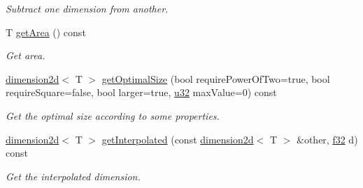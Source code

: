 \begin{DoxyCompactItemize}
\begin{DoxyCompactList}\small\item\em Subtract one dimension from another. \end{DoxyCompactList}\item 
T \hyperlink{classirr_1_1core_1_1dimension2d_a1454be218dbb43736488ff9f4236f0da}{get\+Area} () const \hypertarget{classirr_1_1core_1_1dimension2d_a1454be218dbb43736488ff9f4236f0da}{}\label{classirr_1_1core_1_1dimension2d_a1454be218dbb43736488ff9f4236f0da}

\begin{DoxyCompactList}\small\item\em Get area. \end{DoxyCompactList}\item 
\hyperlink{classirr_1_1core_1_1dimension2d}{dimension2d}$<$ T $>$ \hyperlink{classirr_1_1core_1_1dimension2d_a0490f90fb05d89434cdf367a835abd28}{get\+Optimal\+Size} (bool require\+Power\+Of\+Two=true, bool require\+Square=false, bool larger=true, \hyperlink{namespaceirr_a0416a53257075833e7002efd0a18e804}{u32} max\+Value=0) const 
\begin{DoxyCompactList}\small\item\em Get the optimal size according to some properties. \end{DoxyCompactList}\item 
\hyperlink{classirr_1_1core_1_1dimension2d}{dimension2d}$<$ T $>$ \hyperlink{classirr_1_1core_1_1dimension2d_a80462f0ce0720f6fc61aed13873db817}{get\+Interpolated} (const \hyperlink{classirr_1_1core_1_1dimension2d}{dimension2d}$<$ T $>$ \&other, \hyperlink{namespaceirr_a0277be98d67dc26ff93b1a6a1d086b07}{f32} d) const 
\begin{DoxyCompactList}\small\item\em Get the interpolated dimension. \end{DoxyCompactList}\end{DoxyCompactItemize}
